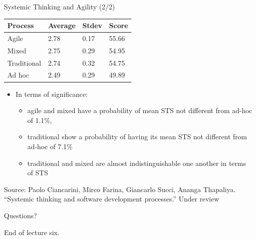 \documentclass{beamer}
\begin{document}
\begin{frame}
{\centerline{Systemic Thinking and Agility (2/2)}}

\begin{center}
\begin{tabular}{|l|l|l|l|}
\midrule
\textbf{Process}             & \textbf{Average} &  \textbf{Stdev} &  \textbf{Score} \\ \midrule
Agile       & 2.78 & 0.17    & 55.66 \\ \midrule
Mixed  & 2.75 & 0.29    & 54.95 \\ \midrule
Traditional   & 2.74  & 0.32   & 54.75 \\ \midrule
Ad hoc            & 2.49 & 0.29    & 49.89 \\ \midrule
\end{tabular}

\end{center}
\begin{itemize}
\item In terms of significance:
\begin{itemize}
    \item agile and mixed have a probability of mean STS not different from ad-hoc of 1.1\%,
    \item traditional show a probability of having its mean STS not different from ad-hoc of 7.1\%
    \item traditional and mixed are almost indistinguishable one another in terms of STS
\end{itemize}
\end{itemize}

\begin{center}
    \tiny{Source: Paolo Ciancarini, Mirco Farina, Giancarlo Succi, Ananga Thapaliya. ``Systemic thinking and software development processes.'' Under review}
\end{center}

\end{frame}


 



\begin{frame}
{\centerline{Questions?}}
\vspace{1cm}
\begin{center}
    \LARGE{End of lecture six.}
\end{center}

\end{frame}
\end{document}
